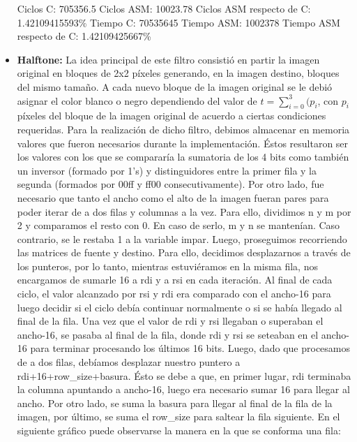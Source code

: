 \documentclass[10pt, a4paper]{article}
\begin{document}
\begin{itemize}
Ciclos C:                 705356.5\newline
Ciclos ASM:               10023.78\newline
Ciclos ASM respecto de C: 1.42109415593\% \newline
Tiempo C:                 70535645\newline
Tiempo ASM:               1002378\newline
Tiempo ASM respecto de C: 1.42109425667\% \newline

\item {\textbf{Halftone:}}
La idea principal de este filtro consistió en partir la imagen original en bloques de 2x2 píxeles generando, en la imagen destino, bloques del mismo tamaño. A cada nuevo bloque de la imagen original se le debió asignar el color blanco o negro dependiendo del valor de $t = \sum_{i=0}^{3} {(p_{i}}$, con $p_{i}$ píxeles del bloque de la imagen original de acuerdo a ciertas condiciones requeridas.\newline
Para la realización de dicho filtro, debimos almacenar en memoria valores que fueron necesarios durante la implementación. Éstos resultaron ser los valores con los que se compararía la sumatoria de los 4 bits como también un inversor (formado por 1's) y distinguidores entre la primer fila y la segunda (formados por 00ff y ff00 consecutivamente).\newline 
Por otro lado, fue necesario que tanto el ancho como el alto de la imagen fueran pares para poder iterar de a dos filas y columnas a la vez. Para ello, dividimos n y m por 2 y comparamos el resto con 0. En caso de serlo, m y n se mantenían. Caso contrario, se le restaba 1 a la variable impar.\newline
Luego, proseguimos recorriendo las matrices de fuente y destino. Para ello, decidimos desplazarnos a través de los punteros, por lo tanto, mientras estuviéramos en la misma fila, nos encargamos de sumarle 16 a rdi y a rsi en cada iteración. Al final de cada ciclo, el valor alcanzado por rsi y rdi era comparado con el ancho-16 para luego decidir si el ciclo debía continuar normalmente o si se había llegado al final de la fila. Una vez que el valor de rdi y rsi llegaban o superaban el ancho-16, se pasaba al final de la fila, donde rdi y rsi se seteaban en el ancho-16 para terminar procesando los últimos 16 bits.\newline
Luego, dado que procesamos de a dos filas, debíamos desplazar nuestro puntero a rdi+16+row\_size+basura. Ésto se debe a que, en primer lugar, rdi terminaba la columna apuntando a ancho-16, luego era necesario sumar 16 para llegar al ancho. Por otro lado, se suma la basura para llegar al final de la fila de la imagen, por último, se suma el row\_size para saltear la fila siguiente. En el siguiente gráfico puede observarse la manera en la que se conforma una fila:\newline

\end{itemize}
\end{document}
